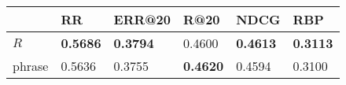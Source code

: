 \begin{tabular}{llllll}
\toprule
{} &               RR &           ERR@20 &             R@20 &             NDCG &              RBP \\
\midrule
$R$    &  \textbf{0.5686} &  \textbf{0.3794} &             0.4600 &  \textbf{0.4613} &  \textbf{0.3113} \\
phrase &           0.5636 &           0.3755 &  \textbf{0.4620} &           0.4594 &           0.3100 \\
\bottomrule
\end{tabular}
